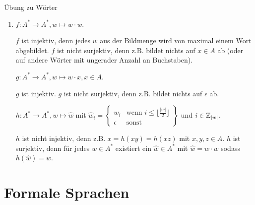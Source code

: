 \begin{frame}{Übung zu Wörter}
	\begin{enumerate}
		\item $f: A^* \rightarrow A^*, w \mapsto w \cdot w$.
		\begin{itemize}
			\pitem $f$ ist injektiv\pause , denn jedes $w$ aus der Bildmenge wird von maximal einem Wort abgebildet.
			\pitem $f$ ist nicht surjektiv\pause , denn z.B. bildet nichts auf $x \in A$ ab (oder auf andere Wörter mit ungerader Anzahl an Buchstaben).
		\end{itemize}
		\pitem $g: A^* \rightarrow A^*, w \mapsto w \cdot x, x \in A$.
		\begin{itemize}
			\pitem $g$ ist injektiv.
			\pitem $g$ ist nicht surjektiv\pause , denn z.B. bildet nichts auf $\epsilon$ ab.
		\end{itemize}
		\pitem $h: A^* \rightarrow A^*, w \mapsto \hat{w}$ mit $ \hat{w}_i = 
		\left\{
		\begin{array}{ll}
		w_i  & \mbox{wenn } i \leq \lfloor\frac{|w|}{2}\rfloor \\
		\epsilon & \mbox{sonst }
		\end{array}
		\right\}
		$ und $i \in \mathbb{Z}_{|w|}$.
		\begin{itemize}
			\pitem $h$ ist nicht injektiv\pause , denn z.B. $x = h(xy) = h(xz)$ mit $x,y,z \in A$.
			\pitem $h$ ist surjektiv\pause , denn für jedes $w \in A^*$ existiert ein $\hat{w} \in A^*$ mit $\hat{w} = w \cdot w$ sodass $h(\hat{w}) = w$.
		\end{itemize}
	\end{enumerate}
\end{frame}

\section{Formale Sprachen}

